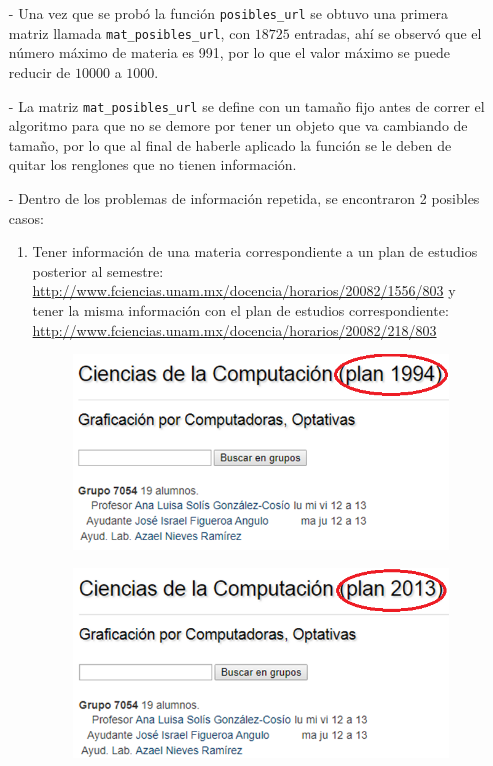 \documentclass[12pt,spanish]{report}
\begin{document}
\begin{itemize}
\begin{enumerate}
\end{enumerate}


\item[-] Una vez que se probó la función \verb+posibles_url+ se obtuvo una primera matriz llamada \verb+mat_posibles_url+, con $18 725$ entradas, ahí se observó que el número máximo de materia es 991, por lo que el valor máximo se puede reducir de $10 000$ a $1 000$.

\item[-] La matriz \verb+mat_posibles_url+ se define con un tamaño fijo antes de correr el algoritmo para que no se demore por tener un objeto que va cambiando de tamaño, por lo que al final de haberle aplicado la función se le deben de quitar los renglones que no tienen información.

\item[-] Dentro de los problemas de información repetida, se encontraron 2 posibles casos:

\begin{enumerate}
\item Tener información de una materia correspondiente a un plan de estudios posterior al semestre: \url{http://www.fciencias.unam.mx/docencia/horarios/20082/1556/803} y tener la misma información con el plan de estudios correspondiente: \url{http://www.fciencias.unam.mx/docencia/horarios/20082/218/803}

\begin{figure}[H]
\centering
\includegraphics[scale = 0.45]{InfoRepetida_A_1} %
\end{figure}

\begin{figure}[H]
\centering
\includegraphics[scale = 0.45]{InfoRepetida_A_2} %
\end{figure}


\end{enumerate}
\end{itemize}
\end{document}
